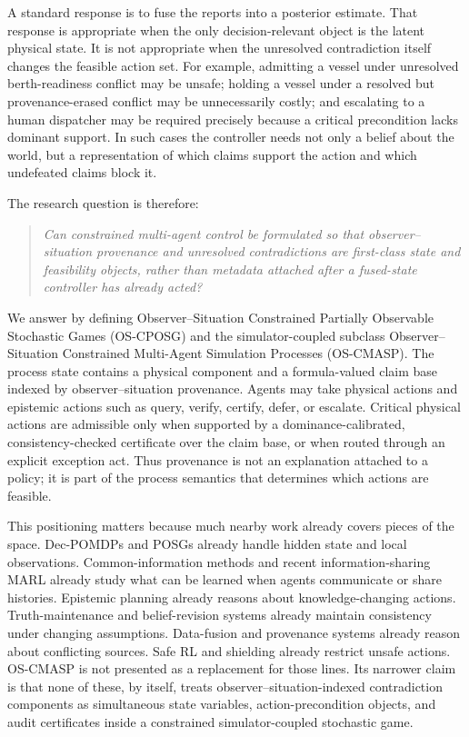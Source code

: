 \documentclass[11pt]{article}
\newcommand{\OSCPOSG}{\mbox{\normalfont\textsc{OS-CPOSG}}}
\newcommand{\OSCMASP}{\mbox{\normalfont\textsc{OS-CMASP}}}
\newcommand{\1}{\mathbf{1}}
\theoremstyle{definition}
\theoremstyle{plain}
\theoremstyle{remark}
\begin{document}
A standard response is to fuse the reports into a posterior estimate. That response is appropriate when the only decision-relevant object is the latent physical state. It is not appropriate when the unresolved contradiction itself changes the feasible action set. For example, admitting a vessel under unresolved berth-readiness conflict may be unsafe; holding a vessel under a resolved but provenance-erased conflict may be unnecessarily costly; and escalating to a human dispatcher may be required precisely because a critical precondition lacks dominant support. In such cases the controller needs not only a belief about the world, but a representation of which claims support the action and which undefeated claims block it.

The research question is therefore:
\begin{quote}
\emph{Can constrained multi-agent control be formulated so that observer--situation provenance and unresolved contradictions are first-class state and feasibility objects, rather than metadata attached after a fused-state controller has already acted?}
\end{quote}

We answer by defining Observer--Situation Constrained Partially Observable Stochastic Games (\OSCPOSG) and the simulator-coupled subclass Observer--Situation Constrained Multi-Agent Simulation Processes (\OSCMASP). The process state contains a physical component and a formula-valued claim base indexed by observer--situation provenance. Agents may take physical actions and epistemic actions such as query, verify, certify, defer, or escalate. Critical physical actions are admissible only when supported by a dominance-calibrated, consistency-checked certificate over the claim base, or when routed through an explicit exception act. Thus provenance is not an explanation attached to a policy; it is part of the process semantics that determines which actions are feasible.

This positioning matters because much nearby work already covers pieces of the space. Dec-POMDPs and POSGs already handle hidden state and local observations. Common-information methods and recent information-sharing MARL already study what can be learned when agents communicate or share histories. Epistemic planning already reasons about knowledge-changing actions. Truth-maintenance and belief-revision systems already maintain consistency under changing assumptions. Data-fusion and provenance systems already reason about conflicting sources. Safe RL and shielding already restrict unsafe actions. \OSCMASP{} is not presented as a replacement for those lines. Its narrower claim is that none of these, by itself, treats observer--situation-indexed contradiction components as simultaneous state variables, action-precondition objects, and audit certificates inside a constrained simulator-coupled stochastic game.
\end{document}
